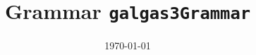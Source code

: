 \documentclass[landscape]{book}
\begin{document}
\title{\Huge{Grammar \texttt{galgas3Grammar}}}
\date \today 

\maketitle


\end{document}
